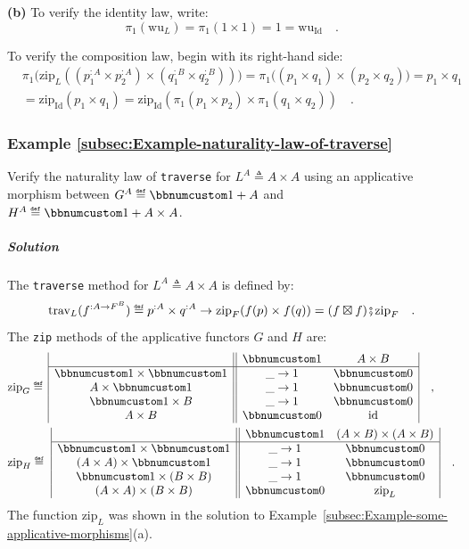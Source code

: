 \textbf{(b)} To verify the identity law, write:
\[
\pi_{1}(\text{wu}_{L})=\pi_{1}(1\times1)=1=\text{wu}_{\text{Id}}\quad.
\]

To verify the composition law, begin with its right-hand side:
\begin{align*}
 & \pi_{1}\big(\text{zip}_{L}((p_{1}^{:A}\times p_{2}^{:A})\times(q_{1}^{:B}\times q_{2}^{:B}))\big)=\pi_{1}\big((p_{1}\times q_{1})\times(p_{2}\times q_{2})\big)=p_{1}\times q_{1}\\
 & =\text{zip}_{\text{Id}}(p_{1}\times q_{1})=\text{zip}_{\text{Id}}(\pi_{1}(p_{1}\times p_{2})\times\pi_{1}(q_{1}\times q_{2}))\quad.
\end{align*}


\subsubsection{Example \label{subsec:Example-naturality-law-of-traverse}\ref{subsec:Example-naturality-law-of-traverse}}

Verify the naturality law of \lstinline!traverse! for $L^{A}\triangleq A\times A$
using an applicative morphism between $G^{A}\triangleq\bbnum 1+A$
and $H^{A}\triangleq\bbnum 1+A\times A$. 

\subparagraph{Solution}

The \lstinline!traverse! method for $L^{A}\triangleq A\times A$
is defined by:
\[
\text{trav}_{L}(f^{:A\rightarrow F^{B}})\triangleq p^{:A}\times q^{:A}\rightarrow\text{zip}_{F}(f(p)\times f(q))=(f\boxtimes f)\bef\text{zip}_{F}\quad.
\]
The \lstinline!zip! methods of the applicative functors $G$ and
$H$ are:
\begin{align*}
 & \text{zip}_{G}\triangleq\,\begin{array}{|c||cc|}
 & \bbnum 1 & A\times B\\
\hline \bbnum 1\times\bbnum 1 & \_\rightarrow1 & \bbnum 0\\
A\times\bbnum 1 & \_\rightarrow1 & \bbnum 0\\
\bbnum 1\times B & \_\rightarrow1 & \bbnum 0\\
A\times B & \bbnum 0 & \text{id}
\end{array}\quad,\\
 & \text{zip}_{H}\triangleq\,\,\begin{array}{|c||cc|}
 & \bbnum 1 & (A\times B)\times(A\times B)\\
\hline \bbnum 1\times\bbnum 1 & \_\rightarrow1 & \bbnum 0\\
(A\times A)\times\bbnum 1 & \_\rightarrow1 & \bbnum 0\\
\bbnum 1\times(B\times B) & \_\rightarrow1 & \bbnum 0\\
(A\times A)\times(B\times B) & \bbnum 0 & \text{zip}_{L}
\end{array}\quad.
\end{align*}
The function $\text{zip}_{L}$ was shown in the solution to Example~\ref{subsec:Example-some-applicative-morphisms}(a). 

